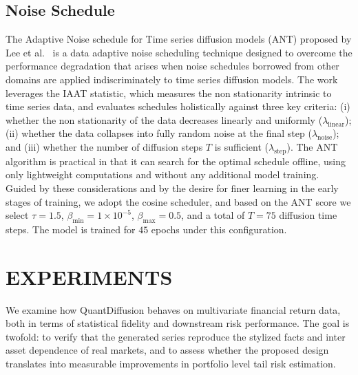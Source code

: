 \documentclass[sigconf,natbib=false]{acmart}
\begin{document}
\subsection{Noise Schedule}
The Adaptive Noise schedule for Time series diffusion models (ANT) proposed by Lee et al.~\cite{ANTLee24} is a data adaptive noise scheduling technique designed to overcome the performance degradation that arises when noise schedules borrowed from other domains are applied indiscriminately to time series diffusion models. The work leverages the IAAT statistic, which measures the non stationarity intrinsic to time series data, and evaluates schedules holistically against three key criteria: (i) whether the non stationarity of the data decreases linearly and uniformly ($\lambda_{\mathrm{linear}}$); (ii) whether the data collapses into fully random noise at the final step ($\lambda_{\mathrm{noise}}$); and (iii) whether the number of diffusion steps $T$ is sufficient ($\lambda_{\mathrm{step}}$). The ANT algorithm is practical in that it can search for the optimal schedule offline, using only lightweight computations and without any additional model training. Guided by these considerations and by the desire for finer learning in the early stages of training, we adopt the cosine scheduler, and based on the ANT score we select $\tau = 1.5$, $\beta_{\min} = 1 \times 10^{-5}$, $\beta_{\max} = 0.5$, and a total of $T = 75$ diffusion time steps. The model is trained for $45$ epochs under this configuration.

\section{EXPERIMENTS}

We examine how QuantDiffusion behaves on multivariate financial return data, both in terms of statistical fidelity and downstream risk performance. The goal is twofold: to verify that the generated series reproduce the stylized facts and inter asset dependence of real markets, and to assess whether the proposed design translates into measurable improvements in portfolio level tail risk estimation.
\end{document}
